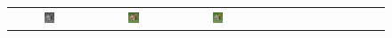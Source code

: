 \documentclass[10pt,twocolumn,letterpaper]{article}
\def\acollumsize{0.14\textwidth}
\begin{document}
\begin{figure}[t!]
\begin{center}
\begin{tabular}{ ccccccccccccc }
\includegraphics[width=\acollumsize]{img/result/2_in.JPEG}&
\includegraphics[width=\acollumsize]{img/result/2.png}&
\includegraphics[width=\acollumsize]{img/result/2_gt.JPEG}& \\


\end{tabular}
\end{center}
\end{figure}
\end{document}
